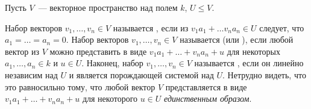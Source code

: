 
Пусть $V$~--- векторное пространство над полем $k$, $U\leq V$.

\begin{definition}
Набор векторов $v_1,\dots,v_n\in V$ называется , если
из $v_1a_1+\dots v_na_n\in U$ следует, что
$a_1=\dots=a_n=0$.
Набор векторов $v_1,\dots,v_n\in V$ называется  (или
), если любой вектор из $V$ можно представить в виде
$v_1a_1+\dots+v_na_n+u$ для некоторых
$a_1,\dots,a_n\in k$ и $u\in U$.
Наконец, набор $v_1,\dots,v_n\in V$ называется , если он линейно независим
над $U$ и является порождающей системой над $U$.
Нетрудно видеть, что это равносильно тому, что любой вектор $V$
представляется в виде $v_1a_1+\dots+v_na_n+u$ для
некоторого $u\in U$ {\em единственным образом}.
\end{definition}

